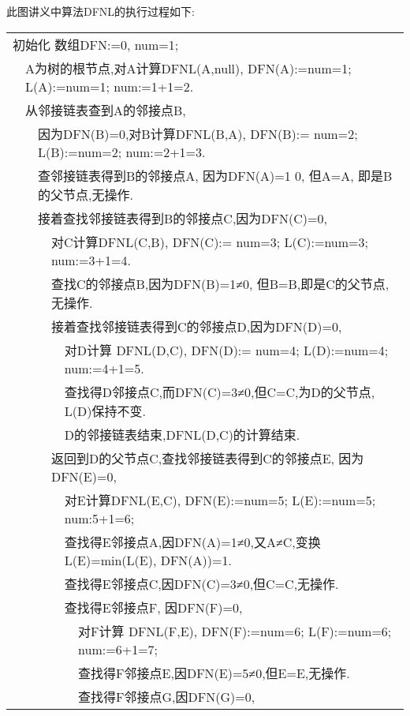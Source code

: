 \begin{solution}
此图讲义中算法DFNL的执行过程如下:\\
{\small
\begin{tabular}{lllllll}
\multicolumn{7}{l}{初始化  数组DFN:=0,  num=1;} \\
 & \multicolumn{6}{l}{A为树的根节点,对A计算DFNL(A,null), DFN(A):=num=1; L(A):=num=1; num:=1+1=2.} \\
 & \multicolumn{6}{l}{从邻接链表查到A的邻接点B,} \\
 &  & \multicolumn{5}{l}{因为DFN(B)=0,对B计算DFNL(B,A), DFN(B):= num=2; L(B):=num=2; num:=2+1=3.} \\
 &  & \multicolumn{5}{l}{查邻接链表得到B的邻接点A, 因为DFN(A)=1 0, 但A=A, 即是B的父节点,无操作.} \\
 &  & \multicolumn{5}{l}{接着查找邻接链表得到B的邻接点C,因为DFN(C)=0,} \\
 &  &  & \multicolumn{4}{l}{对C计算DFNL(C,B), DFN(C):= num=3;  L(C):=num=3; num:=3+1=4.} \\
 &  &  & \multicolumn{4}{l}{查找C的邻接点B,因为DFN(B)=1≠0, 但B=B,即是C的父节点, 无操作.} \\
 &  &  & \multicolumn{4}{l}{接着查找邻接链表得到C的邻接点D,因为DFN(D)=0,} \\
 &  &  &  & \multicolumn{3}{l}{对D计算 DFNL(D,C), DFN(D):= num=4;   L(D):=num=4;  num:=4+1=5.} \\
 &  &  &  & \multicolumn{3}{l}{查找得D邻接点C,而DFN(C)=3≠0,但C=C,为D的父节点, L(D)保持不变.} \\
 &  &  &  & \multicolumn{3}{l}{D的邻接链表结束,DFNL(D,C)的计算结束.} \\
 &  &  & \multicolumn{4}{l}{返回到D的父节点C,查找邻接链表得到C的邻接点E, 因为DFN(E)=0,} \\
 &  &  &  & \multicolumn{3}{l}{对E计算DFNL(E,C), DFN(E):=num=5;   L(E):=num=5;   num:5+1=6;} \\
 &  &  &  & \multicolumn{3}{l}{查找得E邻接点A,因DFN(A)=1≠0,又A≠C,变换L(E)=min(L(E), DFN(A))=1.} \\
 &  &  &  & \multicolumn{3}{l}{查找得E邻接点C,因DFN(C)=3≠0,但C=C,无操作.} \\
 &  &  &  & \multicolumn{3}{l}{查找得E邻接点F, 因DFN(F)=0,} \\
 &  &  &  &  & \multicolumn{2}{l}{对F计算 DFNL(F,E), DFN(F):=num=6;   L(F):=num=6;  num:=6+1=7;} \\
 &  &  &  &  & \multicolumn{2}{l}{查找得F邻接点E,因DFN(E)=5≠0,但E=E,无操作.} \\
 &  &  &  &  & \multicolumn{2}{l}{查找得F邻接点G,因DFN(G)=0,} \\

\end{tabular}}
\end{solution}
